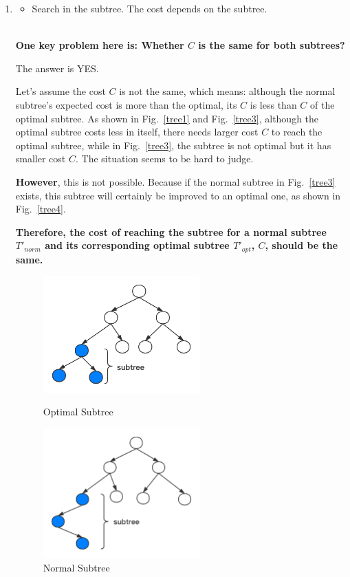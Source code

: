 \documentclass[12pt,a4paper]{article}
\makeatletter
\newtheorem*{solution}{Solution}
\theoremstyle{definition}
\renewenvironment{solution}[1][Solution] {\par\pushQED{\qed}\normalfont\topsep6\p@\@plus6\p@\relax\trivlist\item[\hskip\labelsep\bfseries#1\@addpunct{.}]\ignorespaces}{\popQED\endtrivlist\@endpefalse} \makeatother
\makeatother
\begin{document}
\begin{enumerate}
\begin{enumerate}
\begin{solution}
\begin{itemize}
			    \item Search in the subtree. The cost depends on the subtree.
			\end{itemize}
			
			~\\
			\textbf{One key problem here is: Whether $C$ is the same for both subtrees?} 
			
			The answer is YES.
			
			Let's assume the cost $C$ is not the same, which means:
			although the normal subtree's expected cost is more than the optimal, its $C$ is less than $C$ of the optimal subtree. As shown in Fig.~\ref{tree1} and Fig.~\ref{tree3}, although the optimal subtree costs less in itself, there needs larger cost $C$ to reach the optimal subtree, while in Fig.~\ref{tree3}, the subtree is not optimal but it has smaller cost $C$. The situation seems to be hard to judge.
			
			\textbf{However}, this is not possible. Because if the normal subtree in Fig.~\ref{tree3} exists, this subtree will certainly be improved to an optimal one, as shown in Fig.~\ref{tree4}.
			
			\textbf{Therefore, the cost of reaching the subtree for a normal subtree $T'_{norm}$ and its corresponding optimal subtree $T'_{opt}$, $C$, should be the same.}
			
			
			
           \begin{figure}[htbp]
            \centering
            \begin{minipage}[t]{0.48\textwidth}
            \centering
            \includegraphics[width=6cm]{Lab05-YanjieZe/tree1.png}
            \caption{Optimal Subtree}\label{tree1}
            \end{minipage}
            \begin{minipage}[t]{0.48\textwidth}
            \centering
            \includegraphics[width=6cm]{Lab05-YanjieZe/tree2.png}
            \caption{Normal Subtree}\label{tree2}
            \end{minipage}
            \end{figure}


\end{solution}
\end{enumerate}
\end{enumerate}
\end{document}

